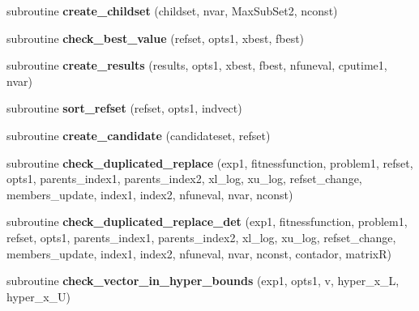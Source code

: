 \begin{DoxyCompactItemize}
\item 
\hypertarget{classscattersearchfunctions_a9b4ba7d5d9ef23dec76a1ca7bf2dda0e}{subroutine {\bfseries create\-\_\-childset} (childset, nvar, Max\-Sub\-Set2, nconst)}\label{classscattersearchfunctions_a9b4ba7d5d9ef23dec76a1ca7bf2dda0e}

\item 
\hypertarget{classscattersearchfunctions_a07567b2af6ded79fb1f567e081d51193}{subroutine {\bfseries check\-\_\-best\-\_\-value} (refset, opts1, xbest, fbest)}\label{classscattersearchfunctions_a07567b2af6ded79fb1f567e081d51193}

\item 
\hypertarget{classscattersearchfunctions_adcc6b415ffb629e2632042a271470389}{subroutine {\bfseries create\-\_\-results} (results, opts1, xbest, fbest, nfuneval, cputime1, nvar)}\label{classscattersearchfunctions_adcc6b415ffb629e2632042a271470389}

\item 
\hypertarget{classscattersearchfunctions_ada4b556b8ef1c78b9cbf6498cfbf446e}{subroutine {\bfseries sort\-\_\-refset} (refset, opts1, indvect)}\label{classscattersearchfunctions_ada4b556b8ef1c78b9cbf6498cfbf446e}

\item 
\hypertarget{classscattersearchfunctions_add07a7ab22c636d720f6ba1e71bf0e4e}{subroutine {\bfseries create\-\_\-candidate} (candidateset, refset)}\label{classscattersearchfunctions_add07a7ab22c636d720f6ba1e71bf0e4e}

\item 
\hypertarget{classscattersearchfunctions_a370ce8279ff86a0f7d7be2879cbafd89}{subroutine {\bfseries check\-\_\-duplicated\-\_\-replace} (exp1, fitnessfunction, problem1, refset, opts1, parents\-\_\-index1, parents\-\_\-index2, xl\-\_\-log, xu\-\_\-log, refset\-\_\-change, members\-\_\-update, index1, index2, nfuneval, nvar, nconst)}\label{classscattersearchfunctions_a370ce8279ff86a0f7d7be2879cbafd89}

\item 
\hypertarget{classscattersearchfunctions_aa4dc250dba4df06e310a3e95e7244c39}{subroutine {\bfseries check\-\_\-duplicated\-\_\-replace\-\_\-det} (exp1, fitnessfunction, problem1, refset, opts1, parents\-\_\-index1, parents\-\_\-index2, xl\-\_\-log, xu\-\_\-log, refset\-\_\-change, members\-\_\-update, index1, index2, nfuneval, nvar, nconst, contador, matrix\-R)}\label{classscattersearchfunctions_aa4dc250dba4df06e310a3e95e7244c39}

\item 
\hypertarget{classscattersearchfunctions_aeebf0937ca54c4d9c79e5bafef8c6ff0}{subroutine {\bfseries check\-\_\-vector\-\_\-in\-\_\-hyper\-\_\-bounds} (exp1, opts1, v, hyper\-\_\-x\-\_\-\-L, hyper\-\_\-x\-\_\-\-U)}\label{classscattersearchfunctions_aeebf0937ca54c4d9c79e5bafef8c6ff0}


\end{DoxyCompactItemize}
